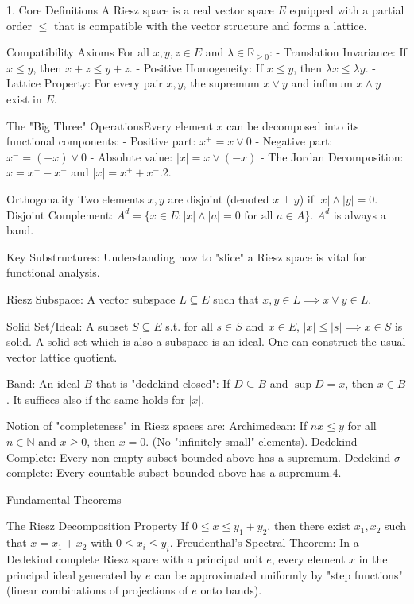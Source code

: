 1. Core Definitions
A Riesz space is a real vector space \( E \) equipped with a partial order \( \leq \) that is compatible with the vector structure and forms a lattice.

Compatibility Axioms
For all \( x, y, z \in E \) and \( \lambda \in \mathbb{R}_{\geq 0} \):
- Translation Invariance: If \( x \leq y \), then \( x + z \leq y + z \).
- Positive Homogeneity: If \( x \leq y \), then \( \lambda x \leq \lambda y \).
- Lattice Property: For every pair \( x, y \), the supremum \( x \vee y \) and infimum \( x \wedge y \) exist in \( E \).

The "Big Three" OperationsEvery element \( x \) can be decomposed into its functional components:
- Positive part: \( x^+ = x \vee 0 \)
- Negative part: \( x^- = (-x) \vee 0 \)
- Absolute value: \( |x| = x \vee (-x) \)
- The Jordan Decomposition: \( x = x^+ - x^- \) and \( |x| = x^+ + x^- \).2. 

Orthogonality
Two elements \( x, y \) are disjoint (denoted \( x \perp y \)) if \( |x| \wedge |y| = 0 \).
Disjoint Complement: \( A^d = \{x \in E : |x| \wedge |a| = 0 \text{ for all } a \in A\} \). \( A^d \) is always a band.

Key Substructures:
Understanding how to "slice" a Riesz space is vital for functional analysis.

Riesz Subspace: 
A vector subspace \( L \subseteq E \) such that \( x, y \in L \implies x \vee y \in L \).

Solid Set/Ideal: 
A subset \( S \subseteq E \) s.t. for all \( s \in S \) and  \( x \in E \), \( |x| \leq |s| \implies x \in S \) 
is solid. A solid set which is also a subspace is an ideal.
One can construct the usual vector lattice quotient.

Band: An ideal \( B \) that is "dedekind closed": 
If \( D \subseteq B \) and \( \sup D = x \), then \( x \in B \).
It suffices also if the same holds for \( |x| \).

Notion of "completeness" in Riesz spaces are:
Archimedean: If \( nx \leq y \) for all \( n \in \mathbb{N} \) and \( x \geq 0 \), then \( x = 0 \). (No "infinitely small" elements).
Dedekind Complete: Every non-empty subset bounded above has a supremum.
Dedekind \( \sigma \)-complete: Every countable subset bounded above has a supremum.4. 

Fundamental Theorems

The Riesz Decomposition Property
If \( 0 \leq x \leq y_1 + y_2 \), then there exist \( x_1, x_2 \) such that \( x = x_1 + x_2 \) with \( 0 \leq x_i \leq y_i \). 
Freudenthal’s Spectral Theorem:
In a Dedekind complete Riesz space with a principal unit \( e \), every element \( x \) in the principal ideal generated by \( e \) can be approximated uniformly by "step functions" 
(linear combinations of projections of \( e \) onto bands).

